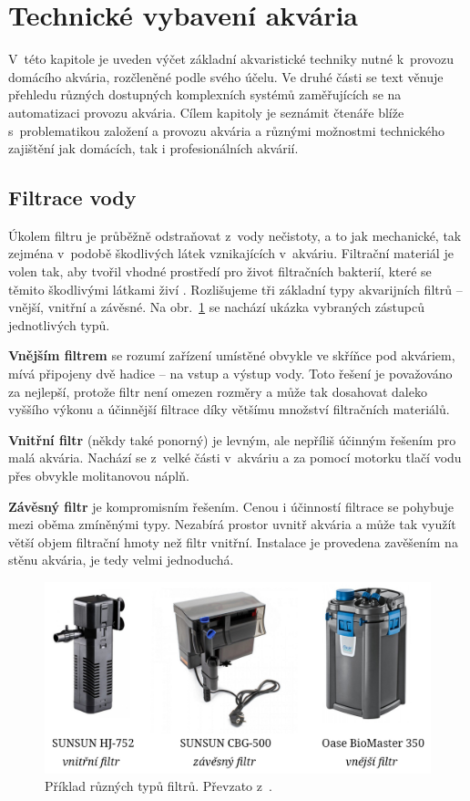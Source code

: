 \section{Technické vybavení akvária}
    V~této kapitole je uveden výčet základní akvaristické techniky nutné k~provozu domácího akvária, rozčleněné podle svého účelu. Ve druhé části se text věnuje přehledu různých dostupných komplexních systémů zaměřujících se na automatizaci provozu akvária. Cílem kapitoly je seznámit čtenáře blíže s~problematikou založení a provozu akvária a různými možnostmi technického zajištění jak domácích, tak i profesionálních akvárií.
    \subsection{Filtrace vody}
        Úkolem filtru je průběžně odstraňovat z~vody nečistoty, a to jak mechanické, tak zejména v~podobě škodlivých látek vznikajících v~akváriu. Filtrační materiál je volen tak, aby tvořil vhodné prostředí pro život filtračních bakterií, které se těmito škodlivými látkami živí \cite{yt-filtrace}. Rozlišujeme tři základní typy akvarijních filtrů -- vnější, vnitřní a závěsné. Na obr.~\ref{fig:filtry-srovnani} se nachází ukázka vybraných zástupců jednotlivých typů.
        
        \textbf{Vnějším filtrem} se rozumí zařízení umístěné obvykle ve skříňce pod akváriem, mívá připojeny dvě hadice -- na vstup a výstup vody. Toto řešení je považováno za nejlepší, protože filtr není omezen rozměry a může tak dosahovat daleko vyššího výkonu a účinnější filtrace díky většímu množství filtračních materiálů. 

        \textbf{Vnitřní filtr} (někdy také ponorný) je levným, ale nepříliš účinným řešením pro malá akvária. Nachází se z~velké části v~akváriu a za pomocí motorku tlačí vodu přes obvykle molitanovou náplň.

        \textbf{Závěsný filtr}  je kompromisním řešením.  Cenou i účinností filtrace se pohybuje mezi oběma zmíněnými typy. Nezabírá prostor uvnitř akvária a může tak využít větší objem filtrační hmoty než filtr vnitřní. Instalace je provedena zavěšením na stěnu akvária, je tedy velmi jednoduchá. 

        \begin{figure}[h!]
            \centering
            \includegraphics[width=\textwidth]{obrazky/filtry/filtry.jpg}
            \caption{Příklad různých typů filtrů. Převzato z~\cite{eshop-rostlinna-akvaria}.}
            \label{fig:filtry-srovnani}
        \end{figure}

